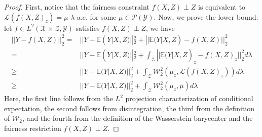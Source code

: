 \documentclass[twoside,11pt]{article}
\begin{document}
\begin{proof}%
First, notice that the fairness constraint $ f(X,Z) \perp Z$ is equivalent to $\mathcal{L}(f(X,Z)_z) = \mu$ $\lambda$-a.e. for some $\mu \in \mathcal{P}(\mathcal{Y})$. Now, we prove the lower bound: let $f \in L^2(\mathcal{X} \times \mathcal{Z},\mathcal{Y})$ satisfies $f(X,Z) \perp Z$, we have
\begin{align*}
||Y - f(X,Z)||_2^2 = & ||Y - \mathbb{E}(Y|X,Z)||_2^2 + ||\mathbb{E}(Y|X,Z) - f(X,Z)||_2^2\\
= & ||Y - \mathbb{E}(Y|X,Z)||_2^2 + \int_{\mathcal{Z}} ||\mathbb{E}(Y|X,Z)_z - f(X,Z)_z||_2^2 d\lambda\\
\geq & ||Y - \mathbb{E}(Y|X,Z)||_2^2 + \int_{\mathcal{Z}} \mathcal{W}_2^2(\mu_z, \mathcal{L}(f(X,Z)_z)) d\lambda\\
\geq & ||Y - \mathbb{E}(Y|X,Z)||_2^2 + \int_{\mathcal{Z}} \mathcal{W}_2^2(\mu_z, \bar{\mu}) d\lambda
\end{align*}
Here, the first line follows from the $L^2$ projection characterization of conditional expectation, the second follows from disintegration, the third from the definition of $\mathcal{W}_2$, and the fourth from the definition of the Wasserstein barycenter and the fairness restriction $ f(X,Z) \perp Z$.


\end{proof}
\end{document}
